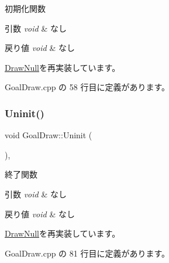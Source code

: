 初期化関数 


\begin{DoxyParams}{引数}
{\em void} & なし \\
\hline
\end{DoxyParams}

\begin{DoxyRetVals}{戻り値}
{\em void} & なし \\
\hline
\end{DoxyRetVals}


\mbox{\hyperlink{class_draw_null_a20aef1e54c1a158b741bfd731e18efdf}{Draw\+Null}}を再実装しています。



 Goal\+Draw.\+cpp の 58 行目に定義があります。

\mbox{\label{class_goal_draw_a01318a0606848a3ca8ca7b7acbf4df24}} 
\subsubsection{\texorpdfstring{Uninit()}{Uninit()}}
{\footnotesize\ttfamily void Goal\+Draw\+::\+Uninit (\begin{DoxyParamCaption}{ }\end{DoxyParamCaption})\hspace{0.3cm}{\ttfamily [override]}, {\ttfamily [virtual]}}



終了関数 


\begin{DoxyParams}{引数}
{\em void} & なし \\
\hline
\end{DoxyParams}

\begin{DoxyRetVals}{戻り値}
{\em void} & なし \\
\hline
\end{DoxyRetVals}


\mbox{\hyperlink{class_draw_null_a6e81d63efab7333e8d0e8af99362a4d9}{Draw\+Null}}を再実装しています。



 Goal\+Draw.\+cpp の 81 行目に定義があります。

\mbox{\label{class_goal_draw_a6e003277ed44eb9c800a616b6acbcb20}} 
